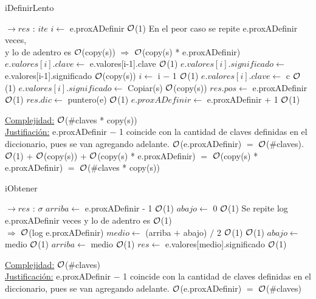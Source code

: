 \begin{Representacion}
	\begin{algorithm}[H]
		\caption{iDefinirLento}
		\begin{algorithmic}
			 $\to res$ : $ite$
				\State $i \gets$ e.proxADefinir \Comment $\mathcal{O}$(1)
				 \Comment En el peor caso se repite e.proxADefinir veces,\\
				 \hfill y lo de adentro es $\mathcal{O}$(copy(s)) $\Rightarrow$ $\mathcal{O}$(copy(s) * e.proxADefinir)	
					\State $e.valores[i].clave \gets$ e.valores[i-1].clave \Comment $\mathcal{O}$(1)
					\State $e.valores[i].significado \gets$ e.valores[i-1].significado \Comment $\mathcal{O}$(copy(s))
					\State $i \gets$ i $-$ 1 \Comment $\mathcal{O}$(1)
				\EndWhile
				\State $e.valores[i].clave \gets$ c \Comment $\mathcal{O}$(1)
				\State $e.valores[i].significado \gets$ Copiar(s) \Comment $\mathcal{O}$(copy(s))
				\State $res.pos \gets$ e.proxADefinir \Comment $\mathcal{O}$(1)
				\State $res.dic \gets$ puntero(e) \Comment $\mathcal{O}$(1)
				\State $e.proxADefinir \gets$ e.proxADefinir + 1 \Comment $\mathcal{O}$(1)
			\EndProcedure
		\end{algorithmic}
		\underline{Complejidad:} $\mathcal{O}$($\#$claves * copy(s))\\
		\underline{Justifiación:} e.proxADefinir $-$ 1 coincide con la cantidad de claves definidas en el diccionario, pues se van agregando adelante. $\mathcal{O}$(e.proxADefinir) $=$ $\mathcal{O}$($\#$claves). $\mathcal{O}$(1) + $\mathcal{O}$(copy(s)) + $\mathcal{O}$(copy(s) * e.proxADefinir) $=$ $\mathcal{O}$(copy(s) * e.proxADefinir) $=$ $\mathcal{O}$($\#$claves * copy(s))
	\end{algorithm}	
	
	
	\begin{algorithm}[H]
		\caption{iObtener}
		\begin{algorithmic}
			 $\to res$ : $\sigma$
				\State $arriba \gets$ e.proxADefinir - 1 \Comment $\mathcal{O}$(1)
				\State $abajo \gets$ 0 \Comment $\mathcal{O}$(1)
				 \Comment Se repite log e.proxADefinir veces y lo de adentro es $\mathcal{O}$(1)\\
				 \hfill $\Rightarrow$ $\mathcal{O}$(log e.proxADefinir)
					\State $	medio \gets$ (arriba $+$ abajo) $/$ 2 \Comment $\mathcal{O}$(1)
					 \Comment $\mathcal{O}$(1)
						\State $abajo \gets$ medio \Comment $\mathcal{O}$(1)
					\Else
						\State $arriba \gets$ medio \Comment $\mathcal{O}$(1)
					\EndIf
				\EndWhile
				\State $res \gets$ e.valores[medio].significado \Comment $\mathcal{O}$(1)
			\EndProcedure
		\end{algorithmic}
		\underline{Complejidad:} $\mathcal{O}$($\#$claves)\\
		\underline{Justificación:} e.proxADefinir $-$ 1 coincide con la cantidad de claves definidas en el diccionario, pues se van agregando adelante. $\mathcal{O}$(e.proxADefinir) $=$ $\mathcal{O}$($\#$claves)
	\end{algorithm}
	
\end{Representacion}